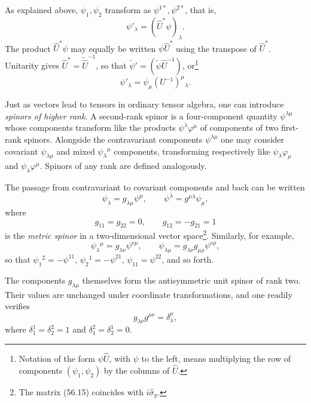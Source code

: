 As explained above, $\psi_1,\psi_2$ transform as
$\psi^{1*},\psi^{2*}$, that is,
\begin{equation}
 \psi'_{\lambda}=(\hat U^*\psi)_\lambda.
 \tag{56.12}
\end{equation}
The product $\hat U^*\psi$ may equally be written $\psi\hat U^*$ using the
transpose of $\hat U^*$. Unitarity gives
$\hat U^*=\widetilde{\hat U}^{-1}$, so that
$\widetilde\psi'=(\widetilde\psi\hat U^{-1})$, or\footnote{Notation of the
form $\psi\hat U$, with $\psi$ to the left, means multiplying the row of
components $(\psi_1,\psi_2)$ by the columns of $\hat U$.}
\begin{equation}
 \psi'_\lambda=\psi_\mu(U^{-1})^\mu{}_{\lambda}.
 \tag{56.13}
\end{equation}

Just as vectors lead to tensors in ordinary tensor algebra, one can introduce
\emph{spinors of higher rank}. A second-rank spinor is a four-component
quantity $\psi^{\lambda\mu}$ whose components transform like the products
$\psi^\lambda\varphi^\mu$ of components of two first-rank spinors. Alongside
the contravariant components $\psi^{\lambda\mu}$ one may consider covariant
$\psi_{\lambda\mu}$ and mixed $\psi_\lambda{}^\mu$ components, transforming
respectively like $\psi_\lambda\varphi_\mu$ and
$\psi_\lambda\varphi^\mu$. Spinors of any rank are defined analogously.

The passage from contravariant to covariant components and back can be written
\begin{equation}
 \psi_\lambda=g_{\lambda\mu}\psi^\mu,\qquad
 \psi^\lambda=g^{\mu\lambda}\psi_\mu,
 \tag{56.14}
\end{equation}
where
\begin{equation}
 g_{11}=g_{22}=0,\qquad g_{12}=-g_{21}=1
 \tag{56.15}
\end{equation}
is the \emph{metric spinor} in a two-dimensional vector space\footnote{The
matrix (56.15) coincides with $i\hat\sigma_y$.}. Similarly, for example,
\[
 \psi_\lambda{}^\mu=g_{\lambda\nu}\psi^{\nu\mu},\qquad
 \psi_{\lambda\mu}=g_{\lambda\nu}g_{\mu\rho}\psi^{\nu\rho},
\]
so that $\psi_1{}^2=-\psi^{11}$, $\psi_2{}^1=-\psi^{21}$,
$\psi_{11}=\psi^{22}$, and so forth.

The components $g_{\lambda\mu}$ themselves form the antisymmetric unit
spinor of rank two. Their values are unchanged under coordinate
transformations, and one readily verifies
\begin{equation}
 g_{\lambda\nu}g^{\mu\nu}=\delta_\lambda^\mu,
 \tag{56.16}
\end{equation}
where $\delta_1^1=\delta_2^2=1$ and
$\delta_1^2=\delta_2^1=0$.

